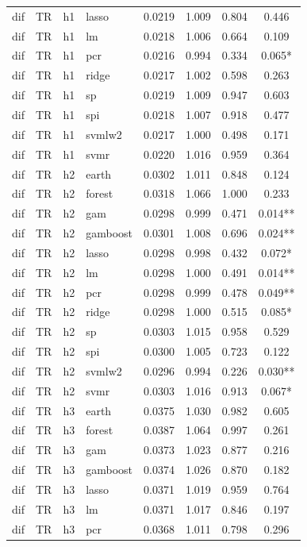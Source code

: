 \begin{ThreePartTable}
\begin{longtable}[t]{llclcccc}
dif & TR & h1 & lasso & 0.0219 & 1.009 & 0.804 & 0.446\\
dif & TR & h1 & lm & 0.0218 & 1.006 & 0.664 & 0.109\\
dif & TR & h1 & pcr & 0.0216 & 0.994 & 0.334 & 0.065*\\
dif & TR & h1 & ridge & 0.0217 & 1.002 & 0.598 & 0.263\\
dif & TR & h1 & sp & 0.0219 & 1.009 & 0.947 & 0.603\\
dif & TR & h1 & spi & 0.0218 & 1.007 & 0.918 & 0.477\\
dif & TR & h1 & svmlw2 & 0.0217 & 1.000 & 0.498 & 0.171\\
dif & TR & h1 & svmr & 0.0220 & 1.016 & 0.959 & 0.364\\
\addlinespace
dif & TR & h2 & earth & 0.0302 & 1.011 & 0.848 & 0.124\\
dif & TR & h2 & forest & 0.0318 & 1.066 & 1.000 & 0.233\\
dif & TR & h2 & gam & 0.0298 & 0.999 & 0.471 & 0.014**\\
dif & TR & h2 & gamboost & 0.0301 & 1.008 & 0.696 & 0.024**\\
dif & TR & h2 & lasso & 0.0298 & 0.998 & 0.432 & 0.072*\\
dif & TR & h2 & lm & 0.0298 & 1.000 & 0.491 & 0.014**\\
dif & TR & h2 & pcr & 0.0298 & 0.999 & 0.478 & 0.049**\\
dif & TR & h2 & ridge & 0.0298 & 1.000 & 0.515 & 0.085*\\
dif & TR & h2 & sp & 0.0303 & 1.015 & 0.958 & 0.529\\
dif & TR & h2 & spi & 0.0300 & 1.005 & 0.723 & 0.122\\
dif & TR & h2 & svmlw2 & 0.0296 & 0.994 & 0.226 & 0.030**\\
dif & TR & h2 & svmr & 0.0303 & 1.016 & 0.913 & 0.067*\\
\addlinespace
dif & TR & h3 & earth & 0.0375 & 1.030 & 0.982 & 0.605\\
dif & TR & h3 & forest & 0.0387 & 1.064 & 0.997 & 0.261\\
dif & TR & h3 & gam & 0.0373 & 1.023 & 0.877 & 0.216\\
dif & TR & h3 & gamboost & 0.0374 & 1.026 & 0.870 & 0.182\\
dif & TR & h3 & lasso & 0.0371 & 1.019 & 0.959 & 0.764\\
dif & TR & h3 & lm & 0.0371 & 1.017 & 0.846 & 0.197\\
dif & TR & h3 & pcr & 0.0368 & 1.011 & 0.798 & 0.296\\

\end{longtable}
\end{ThreePartTable}
